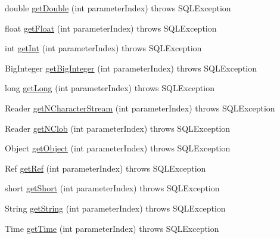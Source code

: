 \begin{DoxyCompactItemize}
\item 
double \mbox{\hyperlink{interfacecom_1_1mysql_1_1cj_1_1jdbc_1_1_parameter_bindings_acb4404a1a457887b9f9043e2fbe49271}{get\+Double}} (int parameter\+Index)  throws S\+Q\+L\+Exception
\item 
float \mbox{\hyperlink{interfacecom_1_1mysql_1_1cj_1_1jdbc_1_1_parameter_bindings_aabaf3ac29ee4abce6ccbc91b57d1af6c}{get\+Float}} (int parameter\+Index)  throws S\+Q\+L\+Exception
\item 
int \mbox{\hyperlink{interfacecom_1_1mysql_1_1cj_1_1jdbc_1_1_parameter_bindings_a7e64ab7c86c8de5512e53311efe3e4ab}{get\+Int}} (int parameter\+Index)  throws S\+Q\+L\+Exception
\item 
Big\+Integer \mbox{\hyperlink{interfacecom_1_1mysql_1_1cj_1_1jdbc_1_1_parameter_bindings_afb97e0615a81251b6b33822cc3651f3d}{get\+Big\+Integer}} (int parameter\+Index)  throws S\+Q\+L\+Exception
\item 
long \mbox{\hyperlink{interfacecom_1_1mysql_1_1cj_1_1jdbc_1_1_parameter_bindings_a5c18c06451d89bc5a1b1c05313d16181}{get\+Long}} (int parameter\+Index)  throws S\+Q\+L\+Exception
\item 
Reader \mbox{\hyperlink{interfacecom_1_1mysql_1_1cj_1_1jdbc_1_1_parameter_bindings_aea27ccf00ef56231aa7c69d1bb65fcfa}{get\+N\+Character\+Stream}} (int parameter\+Index)  throws S\+Q\+L\+Exception
\item 
Reader \mbox{\hyperlink{interfacecom_1_1mysql_1_1cj_1_1jdbc_1_1_parameter_bindings_a3565341b52d4cbd1831fbab228d2a57e}{get\+N\+Clob}} (int parameter\+Index)  throws S\+Q\+L\+Exception
\item 
Object \mbox{\hyperlink{interfacecom_1_1mysql_1_1cj_1_1jdbc_1_1_parameter_bindings_a91324c7e815cf98dbe2ce729fd4110fa}{get\+Object}} (int parameter\+Index)  throws S\+Q\+L\+Exception
\item 
Ref \mbox{\hyperlink{interfacecom_1_1mysql_1_1cj_1_1jdbc_1_1_parameter_bindings_a05bb5f8f48e8d53fe9a990731ca327c8}{get\+Ref}} (int parameter\+Index)  throws S\+Q\+L\+Exception
\item 
short \mbox{\hyperlink{interfacecom_1_1mysql_1_1cj_1_1jdbc_1_1_parameter_bindings_a27bb9677da4867facd2b8e2d2b07c2b1}{get\+Short}} (int parameter\+Index)  throws S\+Q\+L\+Exception
\item 
String \mbox{\hyperlink{interfacecom_1_1mysql_1_1cj_1_1jdbc_1_1_parameter_bindings_a2467855b2d09d28e0d49e213e8a992df}{get\+String}} (int parameter\+Index)  throws S\+Q\+L\+Exception
\item 
Time \mbox{\hyperlink{interfacecom_1_1mysql_1_1cj_1_1jdbc_1_1_parameter_bindings_a5d05e22f5402f6eed14483c989f729d4}{get\+Time}} (int parameter\+Index)  throws S\+Q\+L\+Exception

\end{DoxyCompactItemize}
